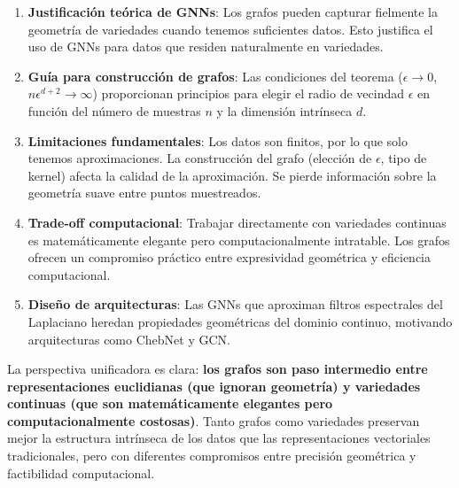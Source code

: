 \begin{enumerate}
	\item \textbf{Justificación teórica de GNNs}: Los grafos pueden capturar fielmente la geometría de variedades cuando tenemos suficientes datos. Esto justifica el uso de \glspl{GNN} para datos que residen naturalmente en variedades.

	\item \textbf{Guía para construcción de grafos}: Las condiciones del teorema ($\epsilon \to 0$, $n\epsilon^{d+2} \to \infty$) proporcionan principios para elegir el radio de vecindad $\epsilon$ en función del número de muestras $n$ y la dimensión intrínseca $d$.

	\item \textbf{Limitaciones fundamentales}: Los datos son finitos, por lo que solo tenemos aproximaciones. La construcción del grafo (elección de $\epsilon$, tipo de kernel) afecta la calidad de la aproximación. Se pierde información sobre la geometría suave entre puntos muestreados.

	\item \textbf{Trade-off computacional}: Trabajar directamente con variedades continuas es matemáticamente elegante pero computacionalmente intratable. Los grafos ofrecen un compromiso práctico entre expresividad geométrica y eficiencia computacional.

	\item \textbf{Diseño de arquitecturas}: Las \glspl{GNN} que aproximan filtros espectrales del Laplaciano heredan propiedades geométricas del dominio continuo, motivando arquitecturas como ChebNet y GCN.
\end{enumerate}

La perspectiva unificadora es clara: \textbf{los grafos son paso intermedio entre representaciones euclidianas (que ignoran geometría) y variedades continuas (que son matemáticamente elegantes pero computacionalmente costosas)}. Tanto grafos como variedades preservan mejor la estructura intrínseca de los datos que las representaciones vectoriales tradicionales, pero con diferentes compromisos entre precisión geométrica y factibilidad computacional.

